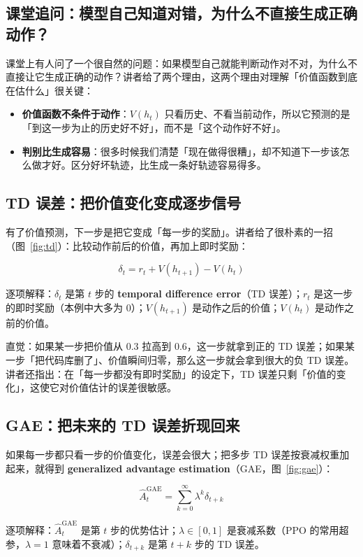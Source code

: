 \documentclass[a4paper]{article}
\begin{document}
\subsection{课堂追问：模型自己知道对错，为什么不直接生成正确动作？}

课堂上有人问了一个很自然的问题：如果模型自己就能判断动作对不对，为什么不直接让它生成正确的动作？讲者给了两个理由，这两个理由对理解「价值函数到底在估什么」很关键：

\begin{itemize}
\item \textbf{价值函数不条件于动作}：$V(h_t)$ 只看历史、不看当前动作，所以它预测的是「到这一步为止的历史好不好」，而不是「这个动作好不好」。
\item \textbf{判别比生成容易}：很多时候我们清楚「现在做得很糟」，却不知道下一步该怎么做才好。区分好坏轨迹，比生成一条好轨迹容易得多。
\end{itemize}

\subsection{TD 误差：把价值变化变成逐步信号}

有了价值预测，下一步是把它变成「每一步的奖励」。讲者给了很朴素的一招（图~\ref{fig:td}）：比较动作前后的价值，再加上即时奖励：

$$\delta_t = r_t + V(h_{t+1}) - V(h_t)$$

逐项解释：$\delta_t$ 是第 $t$ 步的 \textbf{temporal difference error}（TD 误差）；$r_t$ 是这一步的即时奖励（本例中大多为 0）；$V(h_{t+1})$ 是动作之后的价值；$V(h_t)$ 是动作之前的价值。

直觉：如果某一步把价值从 0.3 拉高到 0.6，这一步就拿到正的 TD 误差；如果某一步「把代码库删了」、价值瞬间归零，那么这一步就会拿到很大的负 TD 误差。讲者还指出：在「每一步都没有即时奖励」的设定下，TD 误差只剩「价值的变化」，这使它对价值估计的误差很敏感。

\subsection{GAE：把未来的 TD 误差折现回来}

如果每一步都只看一步的价值变化，误差会很大；把多步 TD 误差按衰减权重加起来，就得到 \textbf{generalized advantage estimation}（GAE，图~\ref{fig:gae}）：

$$\hat{A}_t^{\text{GAE}} = \sum_{k=0}^{\infty} \lambda^k \delta_{t+k}$$

逐项解释：$\hat{A}_t^{\text{GAE}}$ 是第 $t$ 步的优势估计；$\lambda \in [0,1]$ 是衰减系数（PPO 的常用超参，$\lambda=1$ 意味着不衰减）；$\delta_{t+k}$ 是第 $t+k$ 步的 TD 误差。
\end{document}
